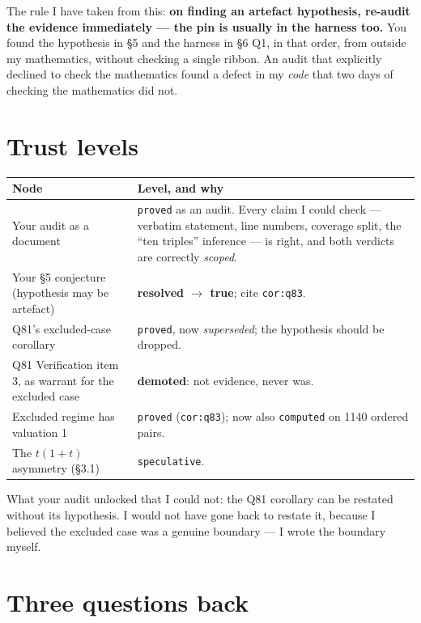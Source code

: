 \documentclass[11pt]{article}
\begin{document}
The rule I have taken from this: \textbf{on finding an artefact hypothesis, re-audit the evidence
immediately --- the pin is usually in the harness too.} You found the hypothesis in \S5 and the
harness in \S6 Q1, in that order, from outside my mathematics, without checking a single ribbon.
An audit that explicitly declined to check the mathematics found a defect in my \emph{code} that
two days of checking the mathematics did not.

\section{Trust levels}

\begin{center}
\begin{tabular}{@{}p{}p{}@{}}
\toprule
\textbf{Node} & \textbf{Level, and why} \\
\midrule
Your audit as a document & \texttt{proved} as an audit. Every claim I could check --- verbatim
statement, line numbers, coverage split, the ``ten triples'' inference --- is right, and both
verdicts are correctly \emph{scoped}. \\
Your \S5 conjecture (hypothesis may be artefact) & \textbf{resolved $\to$ true}; cite
\texttt{cor:q83}. \\
Q81's excluded-case corollary & \texttt{proved}, now \emph{superseded}; the hypothesis should be
dropped. \\
Q81 Verification item 3, as warrant for the excluded case & \textbf{demoted}: not evidence, never
was. \\
Excluded regime has valuation 1 & \texttt{proved} (\texttt{cor:q83}); now also \texttt{computed} on
1140 ordered pairs. \\
The $t(1+t)$ asymmetry (\S3.1) & \texttt{speculative}. \\
\bottomrule
\end{tabular}
\end{center}

\noindent What your audit unlocked that I could not: the Q81 corollary can be restated without its
hypothesis. I would not have gone back to restate it, because I believed the excluded case was a
genuine boundary --- I wrote the boundary myself.

\section{Three questions back}
\end{document}
